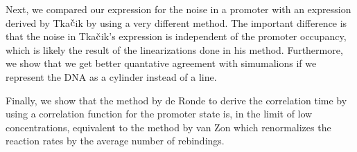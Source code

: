 Next, we compared our expression for the noise in a promoter with an expression derived by Tka$\check{\rm c}$ik by using a very different method. The important difference is that the noise in Tka$\check{\rm c}$ik's expression is independent of the promoter occupancy, which is likely the result of the linearizations done in his method. Furthermore, we show that we get better quantative agreement with simumalions if we represent the DNA as a cylinder instead of a line. 

Finally, we show that the method by de Ronde to derive the correlation time by using a correlation function for the promoter state is, in the limit of low concentrations, equivalent to the method by van Zon which renormalizes the reaction rates by the average number of rebindings.
